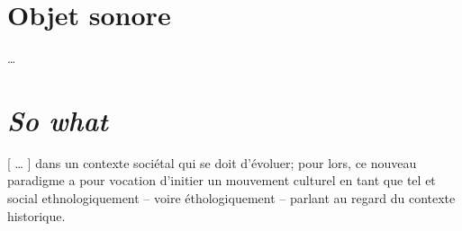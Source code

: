 \documentclass{article}
\newcommand{\footref}[1]{%
  \enotezwritemark{\enmarkstyle\ref{#1}}%
}
\begin{document}


\bigskip

%    
  

\section{Objet sonore}

…


\bigskip

%    
  

\section{\textsl{So what}}

[ … ] dans un contexte sociétal qui se doit d'évoluer; pour lors, ce nouveau paradigme a pour vocation d'initier un mouvement culturel en tant que tel et social ethnologiquement -- voire éthologiquement -- parlant au regard du contexte historique.%


\bigskip


\newpage
  
\nolinenumbers
{}
\printendnotes

\newpage
\end{document}
